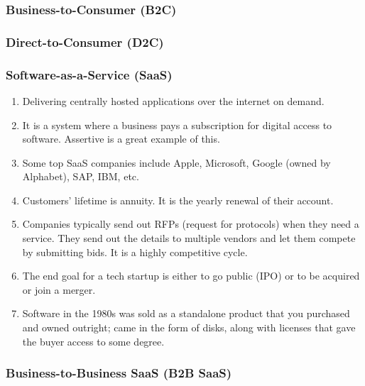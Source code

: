 \subsubsection{Business-to-Consumer (B2C)}

\subsubsection{Direct-to-Consumer (D2C)}

\subsubsection{Software-as-a-Service (SaaS)}

\begin{enumerate}
    \item Delivering centrally hosted applications over the internet on demand.
    \item It is a system where a business pays a subscription for digital access to
    software. Assertive is a great example of this.
    \item Some top SaaS companies include Apple, Microsoft, Google (owned by Alphabet),
    SAP, IBM, etc.
    \item Customers' lifetime is annuity. It is the yearly renewal of their account.
    \item Companies typically send out RFPs (request for protocols) when they need a
    service. They send out the details to multiple vendors and let them compete by
    submitting bids. It is a highly competitive cycle.
    \item The end goal for a tech startup is either to go public (IPO) or to be
    acquired or join a merger.
    \item Software in the 1980s was sold as a standalone product that you purchased and
    owned outright; came in the form of disks, along with licenses that gave the buyer
    access to some degree.
\end{enumerate}

\subsubsection{Business-to-Business SaaS (B2B SaaS)}

